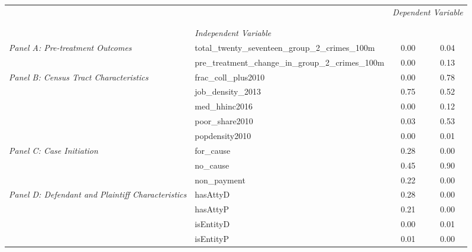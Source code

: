 \begin{tabular}{llcc}
\toprule
 &  & \multicolumn{2}{c}{\textit{Dependent Variable}} \\
\cline{3-4}
\\
 &  &  &  \\
 & \emph{Independent Variable} &  &  \\
\midrule
\multirow[c]{2}{3cm}{\textit{Panel A: Pre-treatment Outcomes}} & total_twenty_seventeen_group_2_crimes_100m & 0.00 & 0.04 \\
 & pre_treatment_change_in_group_2_crimes_100m & 0.00 & 0.13 \\
\cline{1-4}
\multirow[c]{5}{3cm}{\textit{Panel B: Census Tract Characteristics}} & frac_coll_plus2010 & 0.00 & 0.78 \\
 & job_density_2013 & 0.75 & 0.52 \\
 & med_hhinc2016 & 0.00 & 0.12 \\
 & poor_share2010 & 0.03 & 0.53 \\
 & popdensity2010 & 0.00 & 0.01 \\
\cline{1-4}
\multirow[c]{3}{3cm}{\textit{Panel C: Case Initiation}} & for_cause & 0.28 & 0.00 \\
 & no_cause & 0.45 & 0.90 \\
 & non_payment & 0.22 & 0.00 \\
\cline{1-4}
\multirow[c]{4}{3cm}{\textit{Panel D: Defendant and Plaintiff Characteristics}} & hasAttyD & 0.28 & 0.00 \\
 & hasAttyP & 0.21 & 0.00 \\
 & isEntityD & 0.00 & 0.01 \\
 & isEntityP & 0.01 & 0.00 \\
\cline{1-4}
\bottomrule
\end{tabular}
